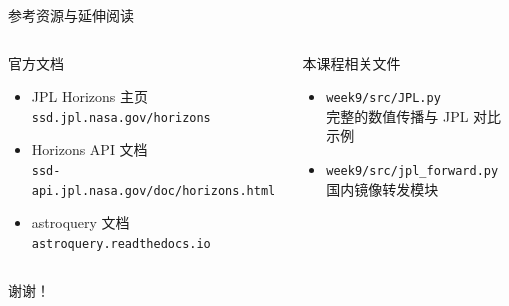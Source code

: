 \documentclass[aspectratio=169]{ctexbeamer}
\begin{document}
\begin{frame}{参考资源与延伸阅读}
\small

\begin{columns}[T]
\begin{block}{官方文档}
\begin{itemize}
  \setlength\itemsep{6pt}
  \item JPL Horizons 主页\\
    \texttt{ssd.jpl.nasa.gov/horizons}
  \item Horizons API 文档\\
    {\footnotesize\texttt{ssd-api.jpl.nasa.gov/doc/horizons.html}}
  \item astroquery 文档\\
    \texttt{astroquery.readthedocs.io}
\end{itemize}
\end{block}

\begin{block}{本课程相关文件}
\begin{itemize}
  \setlength\itemsep{6pt}
  \item \texttt{week9/src/JPL.py}\\
    \scriptsize 完整的数值传播与 JPL 对比示例
  \item \texttt{week9/src/jpl\_forward.py}\\
    \scriptsize 国内镜像转发模块
\end{itemize}
\end{block}
\end{columns}

\vspace{0.3cm}

\begin{center}
\Large 谢谢！
\end{center}
\end{frame}
\end{document}
